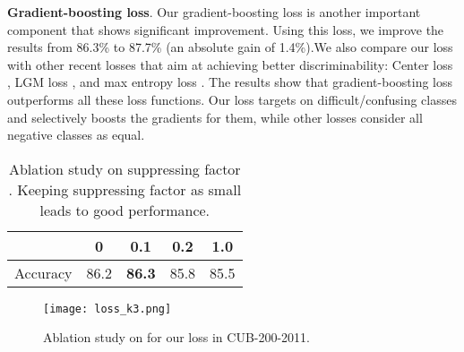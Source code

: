 \documentclass[letterpaper]{article} \usepackage{aaai20}  \usepackage{times}  \usepackage{helvet} \usepackage{courier}  \usepackage[hyphens]{url}  \usepackage{graphicx} \usepackage{multirow}
\begin{document}
\begin{table}[h]
\centering
{}
\caption{Ablation analysis on the CUB-200-2011. Our diversification block (DB) and gradient-boosting loss provide progressive improvements over the baseline.}
\label{tab:ablation_study}
\end{table}

\textbf{Gradient-boosting loss}. Our gradient-boosting loss is another important component that shows significant improvement. Using this loss, we improve the results from 86.3\% to 87.7\% (an absolute gain of 1.4\%).We also compare our loss with other recent losses that aim at achieving better discriminability: Center loss \cite{center_loss}, LGM loss \cite{lgm_loss}, and max entropy loss \cite{max_entropy}.  The results show that gradient-boosting loss outperforms all these loss functions. Our loss targets on difficult/confusing classes and selectively boosts the gradients for them, while other losses consider all negative classes as equal.
\begin{table}[t]
\centering
\begin{tabular}{| *{5}{c|}}
\hline
\centering
      & 0 & 0.1 &0.2 & 1.0 \\ \hline
Accuracy & 86.2  &  \textbf{86.3}   &  85.8   & 85.5 \\ \hline
\end{tabular}
\caption{Ablation study on suppressing factor . Keeping suppressing factor as small leads to good performance.}
\label{tab:ablation_alpha}
\end{table}



\begin{figure}[t]
		\centering
		\texttt{[image: loss\_k3.png]}
	\caption{Ablation study on  for our loss in CUB-200-2011.}
	\label{fig:loss_k}
\end{figure}
\end{document}
